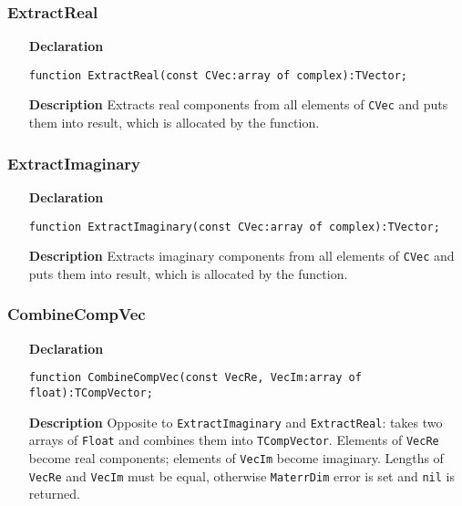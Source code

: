 \documentclass[12pt,a4paper,oneside]{report}
\newcommand{\declarationitem}[1]{\textbf{#1}}
\newcommand{\descriptiontitle}[1]{\textbf{#1}}
\newcommand{\code}[1]{\texttt{#1}}
\begin{document}
\subsubsection{ExtractReal}
\label{extractreal}
\begin{itemize}
	\item[\declarationitem{Declaration}\hfill]
	\begin{flushleft}
\code{function ExtractReal(const CVec:array of complex):TVector;}
	\end{flushleft}
	\item[\descriptiontitle{Description}]
	Extracts real components from all elements of \code{CVec} and puts them into result, which is allocated by the function.
\end{itemize}	
\subsubsection{ExtractImaginary}
\label{extractimaginary}
\begin{itemize}
	\item[\declarationitem{Declaration}\hfill]
	\begin{flushleft}
\code{function ExtractImaginary(const CVec:array of complex):TVector;}
\end{flushleft}
	\item[\descriptiontitle{Description}]
	Extracts imaginary components from all elements of \code{CVec} and puts them into result, which is allocated by the function.
\end{itemize}	
\subsubsection{CombineCompVec}
\label{combinecompvec}
\begin{itemize}
	\item[\declarationitem{Declaration}\hfill]
	\begin{flushleft}
\code{function CombineCompVec(const VecRe, VecIm:array of float):TCompVector;}
	\end{flushleft}
	\item[\descriptiontitle{Description}]
	Opposite to \code{ExtractImaginary} and \code{ExtractReal}: takes two arrays of \code{Float} and combines them into \code{TCompVector}. Elements of \code{VecRe} become real components; elements of \code{VecIm} become imaginary. Lengths of \code{VecRe} and \code{VecIm} must be equal, otherwise \code{MaterrDim} error is set and \code{nil} is returned.  
\end{itemize}	
\end{document}
